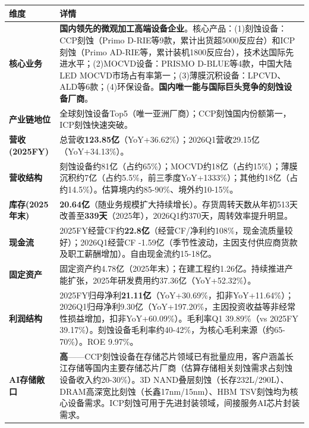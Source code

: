 \begin{exhibitbox}
\centering
\scriptsize
\renewcommand{\arraystretch}{1.20}
\begin{tabularx}{\exhibitboxwidth}{>{\bfseries}p{2.2cm} >{\raggedright\arraybackslash\sloppy\hspace{0pt}}X}
\toprule
\textbf{维度} & \textbf{详情} \\
\midrule
核心业务 & \textbf{国内领先的微观加工高端设备企业}。核心产品：(1)刻蚀设备：CCP刻蚀（Primo D-RIE等9款，累计出货超5000反应台）和ICP刻蚀（Primo AD-RIE等，累计装机1800反应台），技术达国际先进水平；(2)MOCVD设备：PRISMO D-BLUE等4款，中国大陆LED MOCVD市场占有率第一；(3)薄膜沉积设备：LPCVD、ALD等6款；(4)环保设备。\textbf{国内唯一能与国际巨头竞争的刻蚀设备厂商}。 \\
产业链地位 & 全球刻蚀设备Top5（唯一亚洲厂商）；CCP刻蚀国内份额第一，ICP刻蚀快速突破。 \\
营收(2025FY) & 总营收\textbf{123.85亿}（YoY+36.62\%）；2026Q1营收29.15亿（YoY+34.13\%）。 \\
营收结构 & 刻蚀设备约81亿（占约65\%）；MOCVD约18亿（占约15\%）；薄膜沉积约7亿（占约5.5\%，前三季度YoY+1333\%）；其他约18亿（占约14.5\%）。估算境内约85-90\%、境外约10-15\%。 \\
库存(2025年末) & \textbf{20.64亿}（随业务规模扩大持续增长）。存货周转天数从年初513天改善至\textbf{339天}（2025年），2026Q1约370天，周转效率提升明显。 \\
现金流 & 2025FY经营CF约\textbf{22.8亿}（经营CF/净利约108\%，现金流质量较好）；2026Q1经营CF -1.59亿（季节性波动，主因支付供应商货款及职工薪酬增加）。自由现金流约15-18亿。 \\
固定资产 & 固定资产约4.78亿（2025年末）；在建工程约1.26亿。持续推进产能扩张，2025年研发费用约37.36亿（YoY+52.32\%）。 \\
利润结构 & 2025FY归母净利\textbf{21.11亿}（YoY+30.69\%，扣非YoY+11.64\%）；2026Q1归母净利9.30亿（YoY+197.20\%，主因投资收益等非经常性损益增加，扣非YoY+60.09\%）。毛利率Q1 39.89\%（vs 2025FY 39.17\%）。刻蚀设备毛利率约40-42\%，为核心毛利来源（约65-70\%）。ROE 9.97\%。 \\
AI存储敞口 & \textbf{高}——CCP刻蚀设备在存储芯片领域已有批量应用，客户涵盖长江存储等国内主要存储芯片厂商（估算存储相关刻蚀需求占刻蚀设备收入约20-30\%）。3D NAND叠层刻蚀（长存232L/290L）、DRAM高深宽比刻蚀（长鑫17nm/15nm）、HBM TSV刻蚀均为核心设备需求。ICP刻蚀可用于先进封装领域，间接服务AI芯片封装需求。 \\
\bottomrule
\end{tabularx}
\end{exhibitbox}

